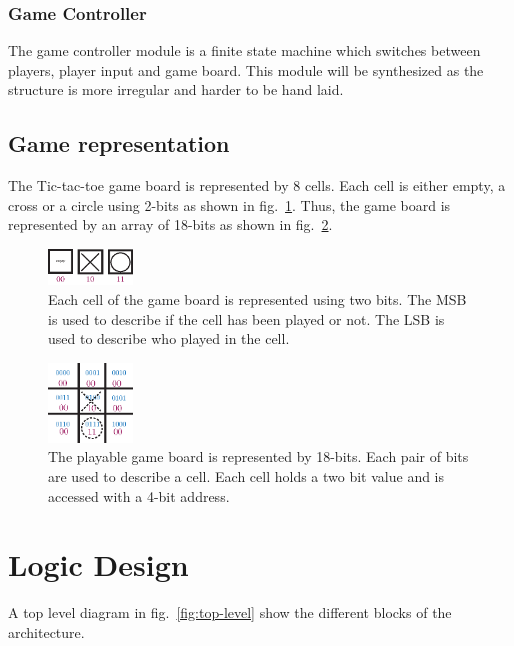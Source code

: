\documentclass[]{article}
\begin{document}
\subsubsection{Game Controller}
The game controller module is a finite state machine which switches between players, player input and game board. This module will be synthesized as the structure is more irregular and harder to be hand laid.

\subsection{Game representation}
The Tic-tac-toe game board is represented by 8 cells. Each cell is either empty, a cross or a circle using 2-bits as shown in fig.~\ref{fig:cell-representation}. Thus, the game board is represented by an array of 18-bits as shown in fig.~\ref{fig:gBoard-representation}.

\begin{figure}
\centering
\includegraphics[width=0.2\textwidth]{cell-representation}
\caption{Each cell of the game board is represented using two bits. The MSB is used to describe if the cell has been played or not. The LSB is used to describe who played in the cell.}
\label{fig:cell-representation}
\end{figure}

\begin{figure}
\centering
\includegraphics[width=0.2\textwidth]{gBoard-representation}
\caption{The playable game board is represented by 18-bits. Each pair of bits are used to describe a cell. Each cell holds a two bit value and is accessed with a 4-bit address.}
\label{fig:gBoard-representation}
\end{figure}



\section{Logic Design}
A top level diagram in fig.~\ref{fig:top-level} show the different blocks of the architecture.
\end{document}
